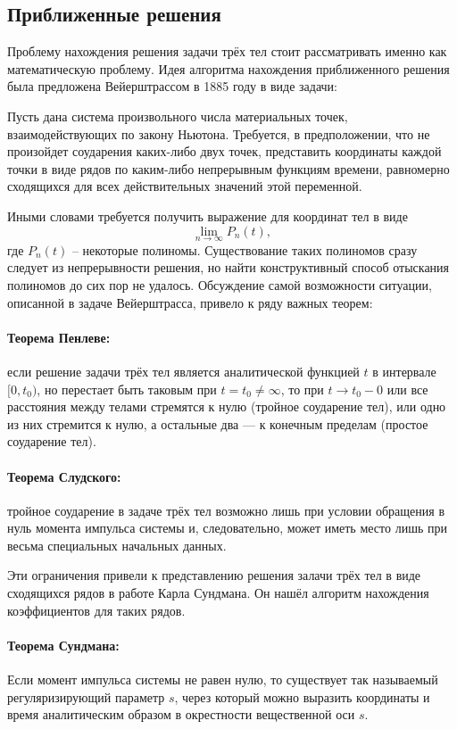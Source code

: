 \documentclass[a4paper, 12pt]{article}%
\begin{document}
\subsection{Приближенные решения}
Проблему нахождения решения задачи трёх тел стоит рассматривать именно как математическую проблему. Идея алгоритма нахождения приближенного решения была предложена Вейерштрассом в 1885 году в виде задачи:

Пусть дана система произвольного числа материальных точек, взаимодействующих по закону Ньютона. Требуется, в предположении, что не произойдет соударения каких-либо двух точек, представить координаты каждой точки в виде рядов по каким-либо непрерывным функциям времени, равномерно сходящихся для всех действительных значений этой переменной.

Иными словами требуется получить выражение для координат тел в виде
\[\lim\limits_{n\to \infty} P_n(t) ,\]
где $P_n(t)$ -- некоторые полиномы. Существование таких полиномов сразу следует из непрерывности решения, но найти конструктивный способ отыскания полиномов до сих пор не удалось. Обсуждение самой возможности ситуации, описанной в задаче Вейерштрасса, привело к ряду важных теорем:
\paragraph{Теорема Пенлеве:} если решение задачи трёх тел является аналитической функцией $t$ в интервале $[0,t_{0})$, но перестает быть таковым при $t=t_{0}\neq\infty$, то при $t\to t_0 -0$ или все расстояния между телами стремятся к нулю (тройное соударение тел), или одно из них стремится к нулю, а остальные два — к конечным пределам (простое соударение тел).
\paragraph{Теорема Слудского:} тройное соударение в задаче трёх тел возможно лишь при условии обращения в нуль момента импульса системы и, следовательно, может иметь место лишь при весьма специальных начальных данных.

Эти ограничения привели к представлению решения залачи трёх тел в виде сходящихся рядов в работе Карла Сундмана. Он нашёл алгоритм нахождения коэффициентов для таких рядов.
\paragraph{Теорема Сундмана:} Если момент импульса системы не равен нулю, то существует так называемый регуляризирующий параметр $s$, через который можно выразить координаты и время аналитическим образом в окрестности вещественной оси $s$.
\end{document}
